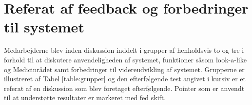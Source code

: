 

\newpage
\section{Referat af feedback og forbedringer til systemet} \label{App:Referat}
Medarbejderne blev inden diskussion inddelt i grupper af henholdsvis to og tre i forhold til at diskutere anvendeligheden af systemet, funktioner såsom look-a-like og Medicinrådet samt forbedringer til videreudvikling af systemet. Grupperne er illustreret af Tabel \ref{table:grupper} og den efterfølgende test angivet i kursiv er et referat af en diskussion som blev foretaget efterfølgende. Pointer som er anvendt til at understøtte resultater er markeret med fed skift.

